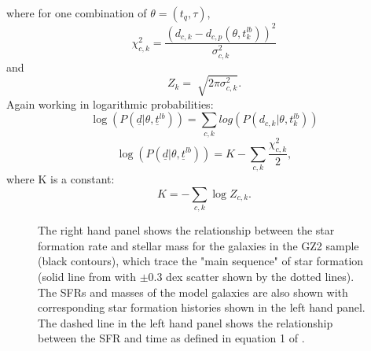 \documentclass{mn2e}
\begin{document}
where for one combination of $\theta = (t_{q}, \tau)$,
\begin{equation*}
\chi_{c, k}^2 = \frac{(d_{c, k} - d_{c, p}(\theta, t_{k}^{lb}))^2}{\sigma_{c, k}^2}
\end{equation*}
and
\begin{equation*}
Z_{k} = \sqrt[]{2\pi\sigma_{c, k}^2}.
\end{equation*}
Again working in logarithmic probabilities:
\begin{equation*}
\log{(P(\underline{d}|\theta, \underline{t}^{lb}))} = \sum_{c, k} log(P(d_{c, k}|\theta, t_{k}^{lb}))
\end{equation*}
\begin{equation*}
\log{(P(\underline{d}|\theta,  \underline{t}^{lb}))}  = K - \sum_{c, k} \frac{\chi_{c, k}^2}{2},
\end{equation*}
where K is a constant:
\begin{equation*}
K = - \sum_{c, k} \log{Z_{c, k}}. 
\end{equation*}

\begin{figure}
\caption{The right hand panel shows the relationship between the star formation rate and stellar mass for the galaxies in the GZ2 sample (black contours), which trace the "main sequence" of star formation (solid line from \cite{Peng} with $\pm0.3$ dex scatter shown by the dotted lines). The SFRs and masses of the model galaxies are also shown with corresponding star formation histories shown in the left hand panel. The dashed line in the left hand panel shows the relationship between the SFR and time as defined in equation 1 of \citet{Peng}.}
\label{sfr_mass}
\end{figure}
\end{document}
